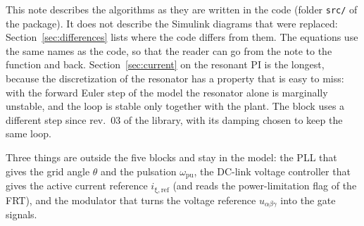 \documentclass[11pt,a4paper]{scrartcl}
\newcommand{\ped}[1]{_{\mathrm{#1}}}
\newcommand{\code}[1]{\texttt{#1}}
\begin{document}
\begin{onehalfspace}
This note describes the algorithms as they are written in the code (folder \code{src/} of the package). It does not describe the Simulink diagrams that were replaced: Section~\ref{sec:differences} lists where the code differs from them. The equations use the same names as the code, so that the reader can go from the note to the function and back. Section~\ref{sec:current} on the resonant PI is the longest, because the discretization of the resonator has a property that is easy to miss: with the forward Euler step of the model the resonator alone is marginally unstable, and the loop is stable only together with the plant. The block uses a different step since rev.~03 of the library, with its damping chosen to keep the same loop.

Three things are outside the five blocks and stay in the model: the PLL that gives the grid angle $\theta$ and the pulsation $\omega\ped{pu}$, the DC-link voltage controller that gives the active current reference $i\ped{\xi,ref}$ (and reads the power-limitation flag of the FRT), and the modulator that turns the voltage reference $u_{\alpha\beta\gamma}$ into the gate signals.


\end{onehalfspace}
\end{document}
